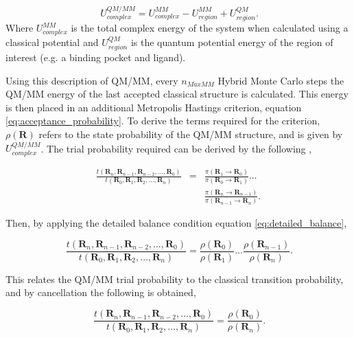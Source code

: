 \begin{equation}
\ U_{complex}^{QM/MM}=U_{complex}^{MM}-U_{region}^{MM}+U_{region}^{QM} .
\end{equation}
%
Where $U_{complex}^{MM}$ is the total complex energy of the system when calculated using a classical potential and $U_{region}^{QM}$ is the quantum potential energy of the region of interest (e.g. a binding pocket and ligand).

Using this description of QM/MM, every $n_{Max MM}$ Hybrid Monte Carlo steps the QM/MM energy of the last accepted classical structure is calculated.  This energy is then placed in an additional Metropolis Hastings criterion, equation \ref{eq:acceptance_probability}.  To derive the terms required for the criterion, $\rho(\mathbf{R})$ refers to the state probability of the QM/MM structure, and is given by $U_{complex}^{QM/MM}$.  The trial probability required can be derived by the following \cite{Iftimie_hybrid_MC},

\begin{eqnarray}
\frac{t(\textbf{R}_n,\textbf{R}_{n-1},\textbf{R}_{n-2},\dots,\textbf{R}_0)}{t(\textbf{R}_0,\textbf{R}_1,\textbf{R}_2,\dots,\textbf{R}_n)} &=& \frac{\pi(\textbf{R}_{1}\rightarrow\textbf{R}_0)}{\pi(\textbf{R}_0\rightarrow\textbf{R}_1)} \dots \nonumber \\
\ && \frac{\pi(\textbf{R}_{n}\rightarrow\textbf{R}_{n-1})}{\pi(\textbf{R}_{n-1}\rightarrow\textbf{R}_{n})} .
\end{eqnarray}

Then, by applying the detailed balance condition equation \ref{eq:detailed_balance},

\begin{equation}
\ \frac{t(\textbf{R}_n,\textbf{R}_{n-1},\textbf{R}_{n-2},\dots,\textbf{R}_0)}{t(\textbf{R}_0,\textbf{R}_1,\textbf{R}_2,\dots,\textbf{R}_n)} = \frac{\rho(\textbf{R}_0)}{\rho(\textbf{R}_1)}\dots\frac{\rho(\textbf{R}_{n-1})}{\rho(\textbf{R}_n)} .
\end{equation}

This relates the QM/MM trial probability to the classical transition probability, and by cancellation the following is obtained,

\begin{equation}
\ \frac{t(\textbf{R}_n,\textbf{R}_{n-1},\textbf{R}_{n-2},\dots,\textbf{R}_0)}{t(\textbf{R}_0,\textbf{R}_1,\textbf{R}_2,\dots,\textbf{R}_n)} = \frac{\rho(\textbf{R}_0)}{\rho(\textbf{R}_n)} .
\end{equation}

